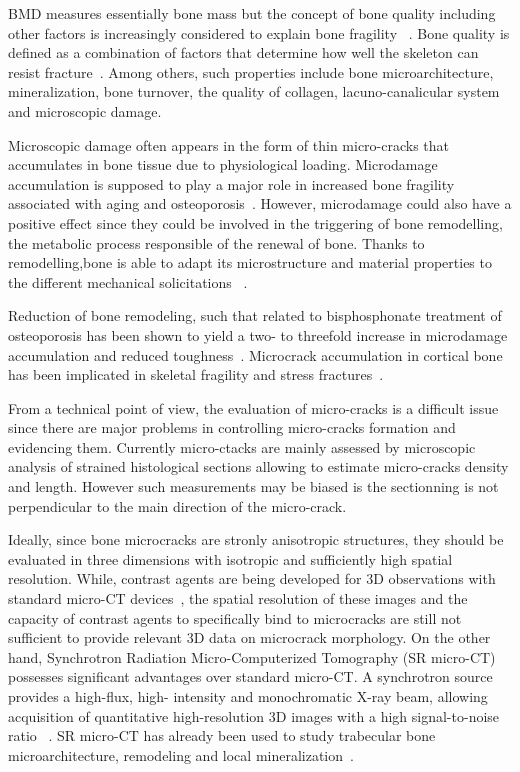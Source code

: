 \documentclass{InsightArticle}
\begin{document}
BMD measures essentially bone mass but the concept of bone quality including other factors
is increasingly considered to explain bone fragility ~\cite{Seeman2008}.
Bone quality is defined as a combination of factors that determine how well
the skeleton can resist fracture~\cite{Licata2009}. Among others, such
properties include bone microarchitecture, mineralization, bone turnover, the
quality of collagen, lacuno-canalicular system and microscopic damage.

Microscopic damage often appears in the form of thin micro-cracks that
accumulates in bone tissue due to physiological loading. Microdamage accumulation
is supposed to play a major role in increased bone fragility associated with aging
and osteoporosis~\cite{Fazzalari2002}. However, microdamage could also have
a positive effect since they could be involved in the triggering of bone remodelling,
the metabolic process responsible of the renewal of bone. Thanks to remodelling,bone
is able to adapt its microstructure and material properties to the
different mechanical solicitations ~\cite{Fratzl2008}.

Reduction of bone remodeling, such that related to bisphosphonate treatment of osteoporosis
has been shown to yield a two- to threefold increase in microdamage accumulation and
reduced toughness~\cite{Mashiba2001}. Microcrack accumulation in cortical bone
has been implicated
in skeletal fragility and stress fractures~\cite{OBrien2005}.

From a technical point of view, the evaluation of micro-cracks is a difficult issue
since there are major problems in controlling micro-cracks formation and evidencing them.
Currently micro-ctacks are mainly assessed by microscopic analysis of strained
histological sections allowing to estimate micro-cracks density and length. However such
measurements may be biased is the sectionning is not perpendicular to the main direction
of the micro-crack.


Ideally, since bone microcracks are stronly anisotropic structures, they should be
evaluated in three dimensions with isotropic and sufficiently high spatial resolution.
While, contrast agents are being developed for 3D observations with standard micro-CT
devices~\cite{Leng2008}, the spatial resolution of these images and the capacity of contrast
agents to specifically bind to microcracks are still not sufficient to provide relevant
3D data on microcrack morphology. On the other hand, Synchrotron Radiation
Micro-Computerized Tomography (SR micro-CT) possesses significant advantages
over standard micro-CT. A synchrotron source provides a high-flux, high-
intensity and monochromatic X-ray beam, allowing acquisition of quantitative
high-resolution 3D images with a high signal-to-noise ratio ~\cite{Salome1999}.
SR micro-CT has already been used to study trabecular bone microarchitecture,
remodeling and local mineralization~\cite{Nuzzo2002}.
\end{document}
